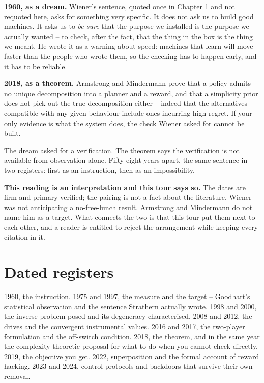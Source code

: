 \textbf{1960, as a dream.} Wiener's sentence, quoted once in Chapter 1 and not requoted here, asks for something very specific. It does not ask us to build good machines. It asks us to \emph{be sure} that the purpose we installed is the purpose we actually wanted -- to check, after the fact, that the thing in the box is the thing we meant. He wrote it as a warning about speed: machines that learn will move faster than the people who wrote them, so the checking has to happen early, and it has to be reliable.

\textbf{2018, as a theorem.} Armstrong and Mindermann prove that a policy admits no unique decomposition into a planner and a reward, and that a simplicity prior does not pick out the true decomposition either -- indeed that the alternatives compatible with any given behaviour include ones incurring high regret. If your only evidence is what the system does, the check Wiener asked for cannot be built.

The dream asked for a verification. The theorem says the verification is not available from observation alone. Fifty-eight years apart, the same sentence in two registers: first as an instruction, then as an impossibility.

\textbf{This reading is an interpretation and this tour says so.} The dates are firm and primary-verified; the pairing is not a fact about the literature. Wiener was not anticipating a no-free-lunch result. Armstrong and Mindermann do not name him as a target. What connects the two is that this tour put them next to each other, and a reader is entitled to reject the arrangement while keeping every citation in it.

\section*{Dated registers}

1960, the instruction. 1975 and 1997, the measure and the target -- Goodhart's statistical observation and the sentence Strathern actually wrote. 1998 and 2000, the inverse problem posed and its degeneracy characterised. 2008 and 2012, the drives and the convergent instrumental values. 2016 and 2017, the two-player formulation and the off-switch condition. 2018, the theorem, and in the same year the complexity-theoretic proposal for what to do when you cannot check directly. 2019, the objective you get. 2022, superposition and the formal account of reward hacking. 2023 and 2024, control protocols and backdoors that survive their own removal.


